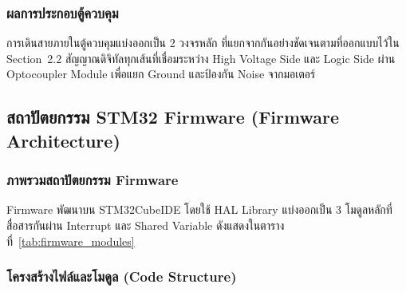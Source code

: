 \subsubsection{ผลการประกอบตู้ควบคุม}
\label{subsubsec:cabinet_assembly_result}


การเดินสายภายในตู้ควบคุมแบ่งออกเป็น 2 วงจรหลัก
ที่แยกจากกันอย่างชัดเจนตามที่ออกแบบไว้ใน Section~2.2
สัญญาณดิจิทัลทุกเส้นที่เชื่อมระหว่าง High Voltage Side
และ Logic Side ผ่าน Optocoupler Module
เพื่อแยก Ground และป้องกัน Noise จากมอเตอร์

\subsection{สถาปัตยกรรม STM32 Firmware (Firmware Architecture)}
\label{subsec:firmware_architecture}

\subsubsection{ภาพรวมสถาปัตยกรรม Firmware}
\label{subsubsec:firmware_architecture_overview}

Firmware พัฒนาบน STM32CubeIDE โดยใช้ HAL Library
แบ่งออกเป็น 3 โมดูลหลักที่สื่อสารกันผ่าน Interrupt
และ Shared Variable ดังแสดงในตารางที่~\ref{tab:firmware_modules}

\subsubsection{โครงสร้างไฟล์และโมดูล (Code Structure)}
\label{subsubsec:code_structure}

